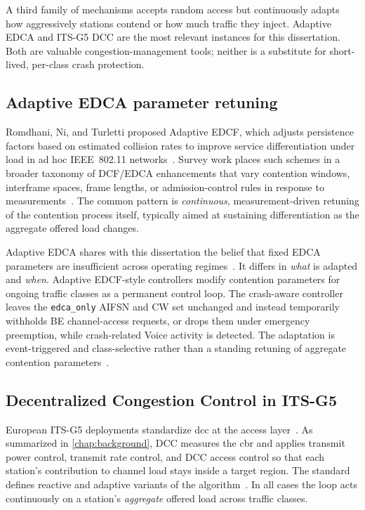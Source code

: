 A third family of mechanisms accepts random access but continuously adapts how aggressively stations contend or how much traffic they inject.
Adaptive EDCA and ITS-G5 DCC are the most relevant instances for this dissertation.
Both are valuable congestion-management tools; neither is a substitute for short-lived, per-class crash protection.

\subsection{Adaptive EDCA parameter retuning}
\label{sec:rw:aedcf}

Romdhani, Ni, and Turletti proposed Adaptive EDCF, which adjusts persistence factors based on estimated collision rates to improve service differentiation under load in ad hoc IEEE~802.11 networks~\cite{romdhani2003AdaptiveEDCF}.
Survey work places such schemes in a broader taxonomy of DCF/EDCA enhancements that vary contention windows, interframe spaces, frame lengths, or admission-control rules in response to measurements~\cite{ni2004Qiang,Evolution_QoS_Mechanisms}.
The common pattern is \emph{continuous}, measurement-driven retuning of the contention process itself, typically aimed at sustaining differentiation as the aggregate offered load changes.

Adaptive EDCA shares with this dissertation the belief that fixed EDCA parameters are insufficient across operating regimes~\cite{romdhani2003AdaptiveEDCF,bianchi2000DCF}.
It differs in \emph{what} is adapted and \emph{when}.
Adaptive EDCF-style controllers modify contention parameters for ongoing traffic classes as a permanent control loop.
The crash-aware controller leaves the \texttt{edca\_only} AIFSN and CW set unchanged and instead temporarily withholds BE channel-access requests, or drops them under emergency preemption, while crash-related Voice activity is detected.
The adaptation is event-triggered and class-selective rather than a standing retuning of aggregate contention parameters~\cite{romdhani2003AdaptiveEDCF}.

\subsection{Decentralized Congestion Control in ITS-G5}
\label{sec:rw:dcc}

European ITS-G5 deployments standardize \gls{dcc} at the access layer~\cite{etsi_dcc_2018}.
As summarized in \autoref{chap:background}, DCC measures the \gls{cbr} and applies transmit power control, transmit rate control, and DCC access control so that each station's contribution to channel load stays inside a target region.
The standard defines reactive and adaptive variants of the algorithm~\cite{etsi_dcc_2018}.
In all cases the loop acts continuously on a station's \emph{aggregate} offered load across traffic classes.

